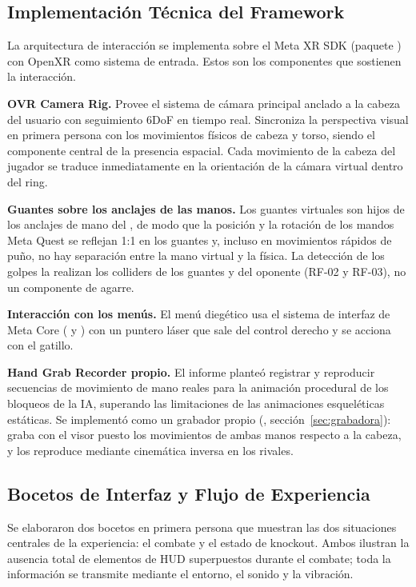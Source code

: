 \subsection{Implementación Técnica del Framework}
La arquitectura de interacción se implementa sobre el Meta XR SDK (paquete ) con OpenXR como sistema de entrada. Estos son los componentes que sostienen la interacción.

\textbf{OVR Camera Rig.} Provee el sistema de cámara principal anclado a la cabeza del usuario con seguimiento 6DoF en tiempo real. Sincroniza la perspectiva visual en primera persona con los movimientos físicos de cabeza y torso, siendo el componente central de la presencia espacial. Cada movimiento de la cabeza del jugador se traduce inmediatamente en la orientación de la cámara virtual dentro del ring.

\textbf{Guantes sobre los anclajes de las manos.} Los guantes virtuales son hijos de los anclajes de mano del , de modo que la posición y la rotación de los mandos Meta Quest se reflejan 1:1 en los guantes y, incluso en movimientos rápidos de puño, no hay separación entre la mano virtual y la física. La detección de los golpes la realizan los colliders de los guantes y del oponente (RF-02 y RF-03), no un componente de agarre.

\textbf{Interacción con los menús.} El menú diegético usa el sistema de interfaz de Meta Core ( y ) con un puntero láser que sale del control derecho y se acciona con el gatillo.

\textbf{Hand Grab Recorder propio.} El informe planteó registrar y reproducir secuencias de movimiento de mano reales para la animación procedural de los bloqueos de la IA, superando las limitaciones de las animaciones esqueléticas estáticas. Se implementó como un grabador propio (, sección~\ref{sec:grabadora}): graba con el visor puesto los movimientos de ambas manos respecto a la cabeza, y  los reproduce mediante cinemática inversa en los rivales.

\subsection{Bocetos de Interfaz y Flujo de Experiencia}
Se elaboraron dos bocetos en primera persona que muestran las dos situaciones centrales de la experiencia: el combate y el estado de knockout. Ambos ilustran la ausencia total de elementos de HUD superpuestos durante el combate; toda la información se transmite mediante el entorno, el sonido y la vibración.

